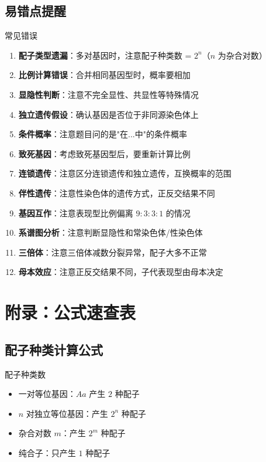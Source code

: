 \documentclass[a4paper,11pt]{ctexart}
\begin{document}
\subsection{易错点提醒}

\begin{notebox}{常见错误}
\begin{enumerate}[leftmargin=2em]
    \item \textbf{配子类型遗漏}：多对基因时，注意配子种类数 = $2^n$（$n$ 为杂合对数）
    \item \textbf{比例计算错误}：合并相同基因型时，概率要相加
    \item \textbf{显隐性判断}：注意不完全显性、共显性等特殊情况
    \item \textbf{独立遗传假设}：确认基因是否位于非同源染色体上
    \item \textbf{条件概率}：注意题目问的是"在...中"的条件概率
    \item \textbf{致死基因}：考虑致死基因型后，要重新计算比例
    \item \textbf{连锁遗传}：注意区分连锁遗传和独立遗传，互换概率的范围
    \item \textbf{伴性遗传}：注意性染色体的遗传方式，正反交结果不同
    \item \textbf{基因互作}：注意表现型比例偏离 $9:3:3:1$ 的情况
    \item \textbf{系谱图分析}：注意判断显隐性和常染色体/性染色体
    \item \textbf{三倍体}：注意三倍体减数分裂异常，配子大多不正常
    \item \textbf{母本效应}：注意正反交结果不同，子代表现型由母本决定
\end{enumerate}
\end{notebox}


\section{附录：公式速查表}

\subsection{配子种类计算公式}

\begin{lemmabox}{配子种类数}
\begin{itemize}[leftmargin=2em]
    \item 一对等位基因：$Aa$ 产生 $2$ 种配子
    \item $n$ 对独立等位基因：产生 $2^n$ 种配子
    \item 杂合对数 $m$：产生 $2^m$ 种配子
    \item 纯合子：只产生 $1$ 种配子
\end{itemize}
\end{lemmabox}
\end{document}
